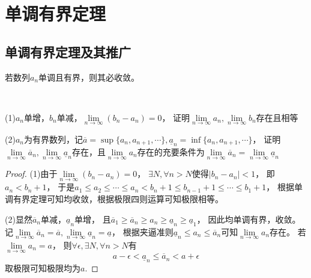 \section{单调有界定理}

\subsection{单调有界定理及其推广}

\begin{theorem}[单调有界定理]
  若数列$a_n$单调且有界，则其必收敛。
\end{theorem}

~

\begin{exercise}[单调有界定理理论推广]
  (1)$a_n$单增，$b_n$单减，$\lim \limits _{n \rightarrow \infty} (b_n - a_n) = 0$，
  证明$\lim \limits _{n \rightarrow \infty} a_n, \lim \limits _{n \rightarrow \infty} b_n$存在且相等

  (2)$a_n$为有界数列，记$\overline{a} = \sup\{a_n,a_{n+1},\cdots\}, \underline{a}_n = \inf\{a_n,a_{n+1},\cdots\}$，
  证明$\lim \limits _{n \rightarrow \infty} \overline{a}_n, \lim \limits _{n \rightarrow \infty} \underline{a}_n$存在，且$\lim \limits _{n \rightarrow \infty} a_n$存在的充要条件为$\lim \limits _{n \rightarrow \infty} \overline{a}_n = \lim \limits _{n \rightarrow \infty} \underline{a}_n$
\end{exercise}

\begin{proof}
  (1)由于$\lim \limits _{n \rightarrow \infty} (b_n - a_n) = 0$，
  $\exists N, \forall n > N$使得$|b_n - a_n| < 1$，
  即$a_n < b_n + 1$，
  于是$a_1 \leq a_2 \leq \cdots \leq a_n < b_n+1 \leq b_{n-1} + 1 \leq \cdots \leq b_1 + 1$，
  根据单调有界定理可知均收敛，根据极限四则运算可知极限相等。

  (2)显然$\overline{a}_n$单减，$\underline{a}_n$单增，
  且$\overline{a}_1 \geq \overline{a}_n \geq a_n \geq \underline{a}_n \geq \underline{a}_1$，
  因此均单调有界，收敛。
  记$\lim \limits _{n \rightarrow \infty} \overline{a}_n = \overline{a}, \lim \limits _{n \rightarrow \infty} \underline{a}_n = \underline{a}$，
  根据夹逼准则$\underline{a}_n \leq a_n \leq \overline{a}_n$可知$\lim \limits _{n \rightarrow \infty} a_n$存在。
  若$\lim \limits _{n \rightarrow \infty} a_n = a$，
  则$\forall \epsilon, \exists N, \forall n > N$有
  \begin{equation*}
    a - \epsilon < \underline{a}_n \leq \overline{a}_n < a + \epsilon
  \end{equation*}
  取极限可知极限均为$a$.
\end{proof}

